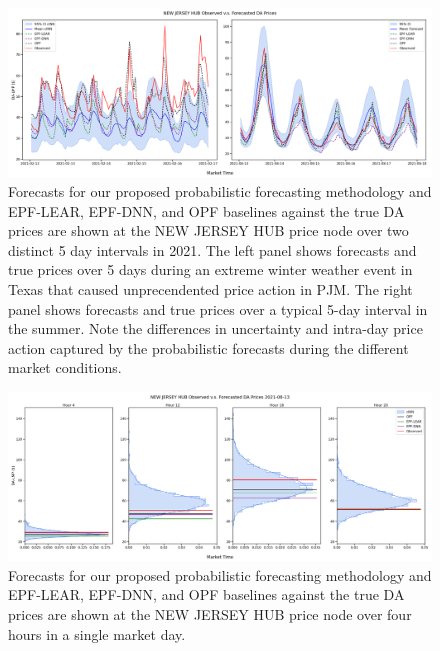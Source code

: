 \begin{figure}[htbp]
    \caption[Timeseries of forecast v.s. observed prices]{
        Forecasts for our proposed probabilistic forecasting methodology and EPF-LEAR, EPF-DNN, and OPF baselines
        against the true DA prices are shown at the NEW JERSEY HUB price node over two distinct 5 day intervals in 2021.
        The left panel shows forecasts and true prices over 5 days during an extreme winter weather event in Texas
        that caused unprecendented price action in PJM.
        The right panel shows forecasts and true prices over a typical 5-day interval in the summer.
        Note the differences in uncertainty and intra-day price action captured by the probabilistic forecasts
        during the different market conditions.
    }
    \begin{center}
        \setlength{\fboxsep}{0pt}%
        \setlength{\fboxrule}{1pt}%
        \includegraphics[width=150mm]{figs/nj_hub_ts}
    \end{center}
    \label{fig:forecast_timeseries}
\end{figure}

\begin{figure}[htbp]
    \caption[Comparison of forecasts at select hours]{
        Forecasts for our proposed probabilistic forecasting methodology and EPF-LEAR, EPF-DNN, and OPF baselines
        against the true DA prices are shown at the NEW JERSEY HUB price node over four hours in a single market day.
    }
    \begin{center}
        \setlength{\fboxsep}{0pt}%
        \setlength{\fboxrule}{1pt}%
        \includegraphics[width=150mm]{figs/nj_hub_densities}
    \end{center}
    \label{fig:univar_dens}
\end{figure}
